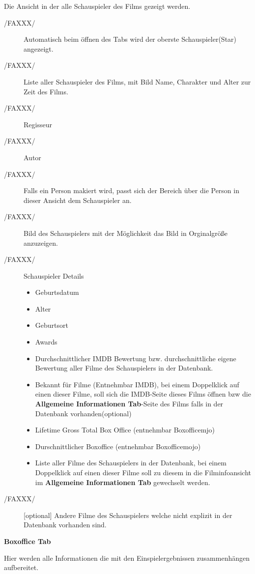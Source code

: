 \begin{description}
\begin{description}
		\item Die Ansicht in der alle Schauspieler des Films gezeigt werden.
			\begin{description}
				\item[/FAXXX/] Automatisch beim öffnen des Tabs wird der oberste Schauspieler(Star) angezeigt.
				\item[/FAXXX/] Liste aller Schauspieler des Films, mit Bild Name, Charakter und Alter zur Zeit des Films.
				\item[/FAXXX/] Regisseur
				\item[/FAXXX/] Autor
				\item[/FAXXX/] Falls ein Person makiert wird, passt sich der Bereich über die Person in dieser Ansicht dem Schauspieler an.
				\item[/FAXXX/] Bild des Schauspielers mit der Möglichkeit das Bild in Orginalgröße anzuzeigen. 
				\item[/FAXXX/] Schauspieler Details
					\begin{itemize}
						\item Geburtsdatum
						\item Alter
						\item Geburtsort
						\item Awards
						\item Durchschnittlicher IMDB Bewertung bzw. durchschnittliche eigene Bewertung aller Filme des Schauspielers in der Datenbank.
						\item Bekannt für Filme (Entnehmbar IMDB), bei einem Doppelklick auf einen dieser Filme, soll sich die IMDB-Seite dieses Films öffnen bzw die \textbf{Allgemeine Informationen Tab}-Seite des Films falls in der Datenbank vorhanden(optional)
						\item Lifetime Gross Total Box Office (entnehmbar Boxofficemjo)
						\item Durschnittlicher Boxoffice (entnehmbar Boxofficemojo)
						\item Liste aller Filme des Schauspielers in der Datenbank, bei einem Doppelklick auf einen dieser Filme soll zu diesem in die Filminfoansicht im \textbf{Allgemeine Informationen Tab} gewechselt werden.
					\end{itemize}
				\item[/FAXXX/] [optional] Andere Filme des Schauspielers welche nicht explizit in der Datenbank vorhanden sind.
			\end{description}
		\item[/FAXXX/] \textbf{Boxoffice Tab}
		\item Hier werden alle Informationen die mit den Einspielergebnissen zusammenhängen aufbereitet.

\end{description}
\end{description}
